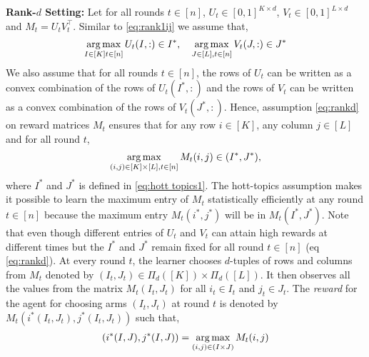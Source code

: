 \textbf{Rank-$d$ Setting:} Let for all rounds $t\in[n]$, $U_t \in [0,1]^{K\times d}$, $V_t \in [0,1]^{L\times d}$ and $M_t = U_t V_t^{\intercal}$. Similar to \eqref{eq:rank1ij} we assume that,
\begin{align}
\mathop{\rm arg\,max}_{I\in[K] t\in [n]}U_{t}(I,:) \in I^\ast, \hspace*{1em}   \mathop{\rm arg\,max}_{J\in[L], t\in [n]}V_{t}(J,:)\in J^\ast \label{eq:rankd}
\end{align}
We also assume that for all rounds $t\in [n]$, the rows of $U_t$ can be written as a convex combination of the rows of $U_t(I^\ast, :)$ and the rows of $V_t$ can be written as a convex combination of the rows of $V_t(J^\ast, :)$. Hence, assumption \eqref{eq:rankd} on reward matrices $M_t$ ensures that for any row $i \in [K]$, any column $j \in [L]$ and for all round $t$,
\begin{align}
  \mathop{\rm arg\,max}_{(i, j) \in [K] \times [L], t\in [n]} M_t(i, j) \in (I^\ast, J^\ast) \label{eq:rewardProp},
\end{align}
where $I^\ast$ and $J^\ast$ is defined in \eqref{eq:hott topics1}. The hott-topics assumption makes it possible to learn the maximum entry of $M_t$ statistically efficiently at any round $t\in[n]$ because the maximum entry $M_t(i^*,j^*)$ will be in $M_t(I^*,J^*)$. Note that even though different entries of $U_t$ and $V_t$ can attain high rewards at different times but the $I^*$ and $J^*$ remain fixed for all round $t\in[n]$ (eq \ref{eq:rankd}). 
At every round $t$, the learner chooses $d$-tuples of rows and columns from $M_t$ denoted by $(I_t,J_t)\in \Pi_d([K])\times \Pi_d([L])$. It then observes all the values from the matrix $M_{t}(I_t,J_t)$ for all $i_t\in I_t$ and $j_t \in J_t$. The \emph{reward} for the agent for choosing arms $(I_t,J_t)$ at round $t$ is denoted by $M_t(i^\ast(I_t,J_t),j^\ast(I_t,J_t))$ such that,
\begin{align}
  (i^\ast(I,J),j^\ast(I,J)) = \mathop{\rm arg\,max}_{(i,j) \in (I\times J)} M_{t}(i,j)
  \label{eq:reward}
\end{align}



